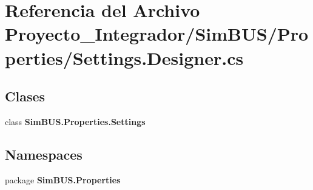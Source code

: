 \section{Referencia del Archivo Proyecto\-\_\-\-Integrador/\-Sim\-B\-U\-S/\-Properties/\-Settings.Designer.\-cs}
\label{_sim_b_u_s_2_properties_2_settings_8_designer_8cs}
\subsection*{Clases}
\begin{DoxyCompactItemize}
\item 
class {\bf Sim\-B\-U\-S.\-Properties.\-Settings}
\end{DoxyCompactItemize}
\subsection*{Namespaces}
\begin{DoxyCompactItemize}
\item 
package {\bf Sim\-B\-U\-S.\-Properties}
\end{DoxyCompactItemize}
